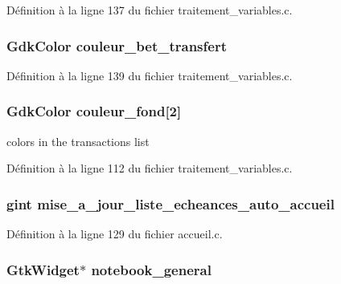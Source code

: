 Définition à la ligne 137 du fichier traitement\_\-variables.c.

\subsubsection[{couleur\_\-bet\_\-transfert}]{\setlength{\rightskip}{0pt plus 5cm}GdkColor {\bf couleur\_\-bet\_\-transfert}}\label{bet__tab_8c_abf473d007a5860d19e62be3c33654a48}


Définition à la ligne 139 du fichier traitement\_\-variables.c.

\subsubsection[{couleur\_\-fond}]{\setlength{\rightskip}{0pt plus 5cm}GdkColor {\bf couleur\_\-fond}[2]}\label{bet__tab_8c_a58089bf9225ae2e274165369f8bc7a00}
colors in the transactions list 

Définition à la ligne 112 du fichier traitement\_\-variables.c.

\subsubsection[{mise\_\-a\_\-jour\_\-liste\_\-echeances\_\-auto\_\-accueil}]{\setlength{\rightskip}{0pt plus 5cm}gint {\bf mise\_\-a\_\-jour\_\-liste\_\-echeances\_\-auto\_\-accueil}}\label{bet__tab_8c_a097d2eb216e05a68a5a153e7b68b6469}


Définition à la ligne 129 du fichier accueil.c.

\subsubsection[{notebook\_\-general}]{\setlength{\rightskip}{0pt plus 5cm}GtkWidget$\ast$ {\bf notebook\_\-general}}\label{bet__tab_8c_a8924516aa4170f932308e93cf93a785b}


